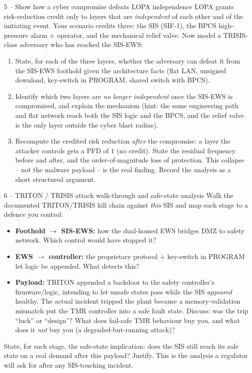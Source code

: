 \documentclass[11pt,a4paper]{article}
\begin{document}
\begin{stepbox}{5 -- Show how a cyber compromise defeats LOPA independence}
LOPA grants risk-reduction credit only to layers that are \emph{independent}
of each other and of the initiating event. Your scenario credits three:
the SIS (SIF-1), the BPCS high-pressure alarm + operator, and the mechanical
relief valve. Now model a TRISIS-class adversary who has reached the SIS-EWS:

\begin{enumerate}[leftmargin=1.6em]\setlength{\itemsep}{1pt}
  \item State, for each of the three layers, whether the adversary can defeat
        it from the SIS-EWS foothold given the architecture facts (flat LAN,
        unsigned download, key-switch in PROGRAM, shared switch with BPCS).
  \item Identify which two layers are \emph{no longer independent} once the
        SIS-EWS is compromised, and explain the mechanism (hint: the same
        engineering path and flat network reach both the SIS logic and the
        BPCS, and the relief valve is the only layer outside the cyber blast
        radius).
  \item Recompute the credited risk reduction \emph{after} the compromise:
        a layer the attacker controls gets a PFD of $1$ (no credit). State the
        residual frequency before and after, and the order-of-magnitude loss
        of protection. This collapse -- not the malware payload -- is the real
        finding. Record the analysis as a short structured argument.
\end{enumerate}
\end{stepbox}

\begin{stepbox}{6 -- TRITON / TRISIS attack walk-through and safe-state analysis}
Walk the documented TRITON/TRISIS kill chain against \emph{this} SIS and map
each stage to a defence you control:
\begin{itemize}[leftmargin=1.4em]\setlength{\itemsep}{1pt}
  \item \textbf{Foothold $\rightarrow$ SIS-EWS:} how the dual-homed EWS bridges
        DMZ to safety network. Which control would have stopped it?
  \item \textbf{EWS $\rightarrow$ controller:} the proprietary protocol +
        key-switch in PROGRAM let logic be appended. What detects this?
  \item \textbf{Payload:} TRITON appended a backdoor to the safety controller's
        firmware/logic, intending to let unsafe states pass while the SIS
        \emph{appeared} healthy. The actual incident tripped the plant because
        a memory-validation mismatch put the TMR controller into a safe fault
        state. Discuss: was the trip ``luck'' or ``design''? What does
        fail-safe TMR behaviour buy you, and what does it \emph{not} buy you
        (a degraded-but-running attack)?
\end{itemize}
State, for each stage, the safe-state implication: does the SIS still reach
its safe state on a real demand after this payload? Justify. This is the
analysis a regulator will ask for after any SIS-touching incident.
\end{stepbox}
\end{document}
